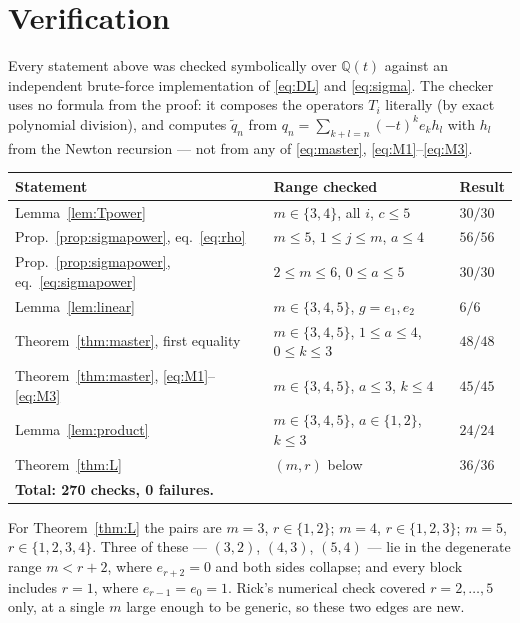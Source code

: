 \documentclass[11pt]{article}
\theoremstyle{plain}
\theoremstyle{definition}
\newcommand{\qq}{\widetilde{q}}
\begin{document}
\section{Verification}

Every statement above was checked symbolically over $\mathbb{Q}(t)$ against an independent
brute-force implementation of \eqref{eq:DL} and \eqref{eq:sigma}. The checker uses no formula
from the proof: it composes the operators $T_i$ literally (by exact polynomial division), and
computes $\qq_n$ from $q_n=\sum_{k+l=n}(-t)^ke_kh_l$ with $h_l$ from the Newton recursion ---
not from any of \eqref{eq:master}, \eqref{eq:M1}--\eqref{eq:M3}.

\begin{center}
\begin{tabular}{lll}
\hline
Statement & Range checked & Result\\
\hline
Lemma~\ref{lem:Tpower} & $m\in\{3,4\}$, all $i$, $c\le5$ & $30/30$\\
Prop.~\ref{prop:sigmapower}, eq.~\eqref{eq:rho} & $m\le5$, $1\le j\le m$, $a\le4$ & $56/56$\\
Prop.~\ref{prop:sigmapower}, eq.~\eqref{eq:sigmapower} & $2\le m\le6$, $0\le a\le5$ & $30/30$\\
Lemma~\ref{lem:linear} & $m\in\{3,4,5\}$, $g=e_1,e_2$ & $6/6$\\
Theorem~\ref{thm:master}, first equality & $m\in\{3,4,5\}$, $1\le a\le4$, $0\le k\le3$ & $48/48$\\
Theorem~\ref{thm:master}, \eqref{eq:M1}--\eqref{eq:M3} & $m\in\{3,4,5\}$, $a\le3$, $k\le4$ & $45/45$\\
Lemma~\ref{lem:product} & $m\in\{3,4,5\}$, $a\in\{1,2\}$, $k\le3$ & $24/24$\\
Theorem~\ref{thm:L} & $(m,r)$ below & $36/36$\\
\hline
\multicolumn{3}{l}{\textbf{Total: 270 checks, 0 failures.}}\\
\hline
\end{tabular}
\end{center}

For Theorem~\ref{thm:L} the pairs are $m=3$, $r\in\{1,2\}$; $m=4$, $r\in\{1,2,3\}$;
$m=5$, $r\in\{1,2,3,4\}$. Three of these --- $(3,2)$, $(4,3)$, $(5,4)$ --- lie in the
degenerate range $m<r+2$, where $e_{r+2}=0$ and both sides collapse; and every block includes
$r=1$, where $e_{r-1}=e_0=1$. Rick's numerical check covered $r=2,\dots,5$ only, at a single
$m$ large enough to be generic, so these two edges are new.
\end{document}
